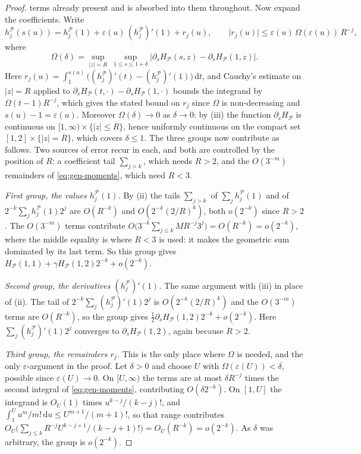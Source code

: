 \documentclass[11pt]{amsart}
\theoremstyle{plain}
\theoremstyle{definition}
\newcommand{\dd}{\,\mathrm d}
\newcommand{\abs}[1]{\lvert #1\rvert}
\begin{document}
\begin{proof}
terms already present and is absorbed into them throughout.
Now expand the coefficients. Write
\[
  h_j^{\mathcal P}(s(u))=h_j^{\mathcal P}(1)
   +\varepsilon(u)\,(h_j^{\mathcal P})'(1)+r_j(u),
  \qquad
  \abs{r_j(u)}\leq\varepsilon(u)\,\Omega(\varepsilon(u))\,R^{-j},
\]
where
\[
  \Omega(\delta)=\sup_{\abs z=R}\ \sup_{1\leq s\leq1+\delta}
   \abs{\partial_sH_{\mathcal P}(s,z)-\partial_sH_{\mathcal P}(1,z)} .
\]
Here $r_j(u)=\int_1^{s(u)}\bigl((h_j^{\mathcal P})'(t)-(h_j^{\mathcal
P})'(1)\bigr)\dd t$, and Cauchy's estimate on $\abs z=R$ applied to
$\partial_sH_{\mathcal P}(t,\cdot)-\partial_sH_{\mathcal P}(1,\cdot)$ bounds
the integrand by $\Omega(t-1)R^{-j}$, which gives the stated bound on $r_j$
since $\Omega$ is non-decreasing and $s(u)-1=\varepsilon(u)$. Moreover
$\Omega(\delta)\to0$ as $\delta\to0$: by (iii) the function
$\partial_sH_{\mathcal P}$ is continuous on
$[1,\infty)\times\{\abs z\leq R\}$, hence uniformly continuous on the compact
set $[1,2]\times\{\abs z=R\}$, which covers $\delta\leq1$. The three groups now contribute as follows. Two sources of error recur in
each, and both are controlled by the position of $R$: a coefficient tail
$\sum_{j>k}$, which needs $R>2$, and the $O(3^{-m})$ remainders of
\eqref{eq:gen-moments}, which need $R<3$.

\emph{First group, the values $h_j^{\mathcal P}(1)$.} By (ii) the tails
$\sum_{j>k}$ of $\sum_jh_j^{\mathcal P}(1)$ and of
$2^{-k}\sum_jh_j^{\mathcal P}(1)2^{j}$ are $O(R^{-k})$ and
$O(2^{-k}(2/R)^{k})$, both $o(2^{-k})$ since $R>2$. The $O(3^{-m})$ terms
contribute
$O\bigl(3^{-k}\sum_{j\leq k}MR^{-j}3^{j}\bigr)=O(R^{-k})=o(2^{-k})$, where the
middle equality is where $R<3$ is used: it makes the geometric sum dominated
by its last term. So this group gives
$H_{\mathcal P}(1,1)+\gamma H_{\mathcal P}(1,2)2^{-k}+o(2^{-k})$.

\emph{Second group, the derivatives $(h_j^{\mathcal P})'(1)$.} The same
argument with (iii) in place of (ii). The tail of
$2^{-k}\sum_j(h_j^{\mathcal P})'(1)2^{j}$ is $O(2^{-k}(2/R)^{k})$ and the
$O(3^{-m})$ terms are $O(R^{-k})$, so the group gives
$\tfrac12\partial_sH_{\mathcal P}(1,2)2^{-k}+o(2^{-k})$. Here
$\sum_j(h_j^{\mathcal P})'(1)2^{j}$ converges to
$\partial_sH_{\mathcal P}(1,2)$, again because $R>2$.

\emph{Third group, the remainders $r_j$.} This is the only place where
$\Omega$ is needed, and the only $\varepsilon$-argument in the proof. Let
$\delta>0$ and choose $U$ with $\Omega(\varepsilon(U))<\delta$, possible since
$\varepsilon(U)\to0$. On $[U,\infty)$ the terms are at most $\delta R^{-j}$
times the second integral of \eqref{eq:gen-moments}, contributing
$O(\delta2^{-k})$. On $[1,U]$ the integrand is $O_U(1)$ times
$u^{k-j}/(k-j)!$, and $\int_1^Uu^m/m!\dd u\leq U^{m+1}/(m+1)!$, so that range
contributes
$O_U\bigl(\sum_{j\leq k}R^{-j}U^{k-j+1}/(k-j+1)!\bigr)=O_U(R^{-k})=o(2^{-k})$.
As $\delta$ was arbitrary, the group is $o(2^{-k})$.


\end{proof}
\end{document}
